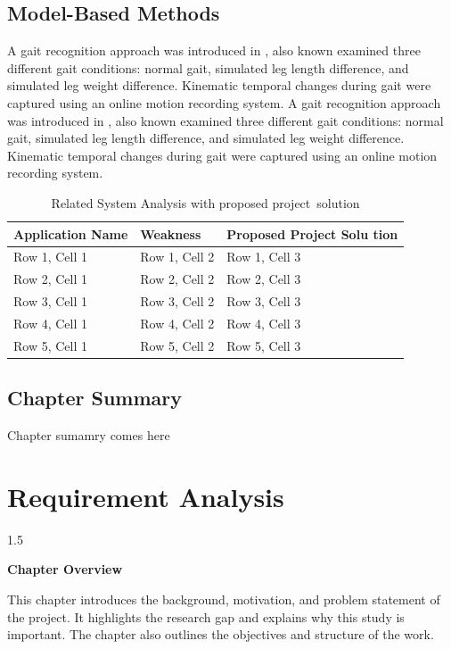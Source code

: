\documentclass[A4paper,12pt]{report}
\theoremstyle{plain}
\theoremstyle{definition}
\theoremstyle{remark}
\numberwithin{equation}{section}
\begin{document}
\section{Model-Based Methods}

A gait recognition approach was introduced in \cite{19}, also known  \cite{ao} examined three different gait conditions: normal gait, simulated leg length difference, and simulated leg weight difference. Kinematic temporal changes during gait were captured using an online motion recording system. 
A gait recognition approach was introduced in \cite{19}, also known  \cite{ao} examined three different gait conditions: normal gait, simulated leg length difference, and simulated leg weight difference. Kinematic temporal changes during gait were captured using an online motion recording system. 
\begin{table}[h!]
\centering
\caption{Related System Analysis with proposed project solution}
\label{tab:sample}
\begin{tabular}{|p{}|p{}|p{}|}
\hline
\textbf{Application Name} & \textbf{Weakness} & \textbf{Proposed Project Solu
tion} \\ \hline
Row 1, Cell 1 & Row 1, Cell 2 & Row 1, Cell 3 \\ \hline
Row 2, Cell 1 & Row 2, Cell 2 & Row 2, Cell 3 \\ \hline
Row 3, Cell 1 & Row 3, Cell 2 & Row 3, Cell 3 \\ \hline
Row 4, Cell 1 & Row 4, Cell 2 & Row 4, Cell 3 \\ \hline
Row 5, Cell 1 & Row 5, Cell 2 & Row 5, Cell 3 \\ \hline
\end{tabular}
\end{table}




\section{Chapter Summary}

Chapter sumamry comes here

\chapter{Requirement Analysis}
\thispagestyle{empty}
\newpage
\begin{spacing}{1.5}

\thispagestyle{empty}

{\centering \Large \bfseries Chapter Overview \par}
\vspace{1cm} %

This chapter introduces the background, motivation, and problem
statement of the project. It highlights the research gap and explains
why this study is important. The chapter also outlines the objectives
and structure of the work.

\end{spacing}
\end{document}
